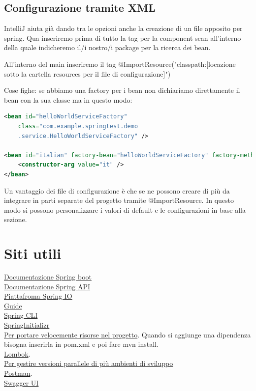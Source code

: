 \documentclass[11pt,a4paper]{book}
\begin{document}
\section{Configurazione tramite XML}
IntelliJ aiuta già dando tra le opzioni anche la creazione di un file apposito per spring. Qua inseriremo prima di tutto la tag per la component scan all'interno della quale indicheremo il/i nostro/i package per la ricerca dei bean.

All'interno del main inseriremo il tag @ImportResource("classpath:[locazione sotto la cartella resources per il file di configurazione]")

Cose fighe: se abbiamo una factory per i bean non dichiariamo direttamente il bean con la sua classe ma in questo modo:
\begin{lstlisting}[language = XML]
<bean id="helloWorldServiceFactory" 
	class="com.example.springtest.demo
	.service.HelloWorldServiceFactory" />

<bean id="italian" factory-bean="helloWorldServiceFactory" factory-method="helloWorldServiceCreate">
	<constructor-arg value="it" />
</bean>
\end{lstlisting}

Un vantaggio dei file di configurazione è che se ne possono creare di più da integrare in parti separate del progetto tramite @ImportResource. In questo modo si possono personalizzare i valori di default e le configurazioni in base alla sezione.


\chapter*{Siti utili}
\href{http://docs.spring.io/spring-boot/docs/current/reference/htmlsingle}{Documentazione Spring boot} \\
\href{http://docs.spring.io/spring-boot/docs/current/api/}{Documentazione Spring API} \\
\href{http://spring.io/projects}{Piattafroma Spring IO} \\
\href{http://spring.io/guides}{Guide} \\
\href{https://docs.spring.io/spring-boot/docs/current/reference/html/spring-boot-cli.html}{Spring CLI} \\
\href{Codici/SpringInitializr}{SpringInitializr} \\
\href{https://www.webjars.org/}{Per portare velocemente risorse nel progetto}. Quando si aggiunge una dipendenza bisogna inserirla in pom.xml e poi fare mvn install. \\
\href{https://projectlombok.org/}{Lombok}. \\
\href{https://sdkman.io/}{Per gestire versioni parallele di più ambienti di sviluppo} \\
\href{https://www.postman.com/}{Postman}. \\
\href{https://swagger.io/tools/swagger-ui/}{Swagger UI} \\
\end{document}
